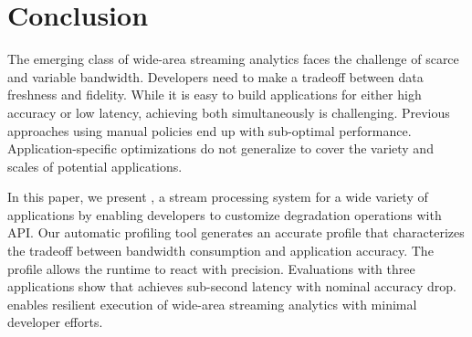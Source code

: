 \section{Conclusion}
\label{sec:conclusion}

The emerging class of wide-area streaming analytics faces the challenge of
scarce and variable bandwidth. Developers need to make a tradeoff between data
freshness and fidelity. While it is easy to build applications for either high
accuracy or low latency, achieving both simultaneously is challenging. Previous
approaches using manual policies end up with sub-optimal
performance. Application-specific optimizations do not generalize to cover the
variety and scales of potential applications.

In this paper, we present \sysname{}, a stream processing system for a wide
variety of applications by enabling developers to customize degradation
operations with \maybe{} API. Our automatic profiling tool generates an accurate
profile that characterizes the tradeoff between bandwidth consumption and
application accuracy. The profile allows the runtime to react with
precision. Evaluations with three applications show that \sysname{} achieves
sub-second latency with nominal accuracy drop. \sysname{} enables resilient
execution of wide-area streaming analytics with minimal developer efforts.

